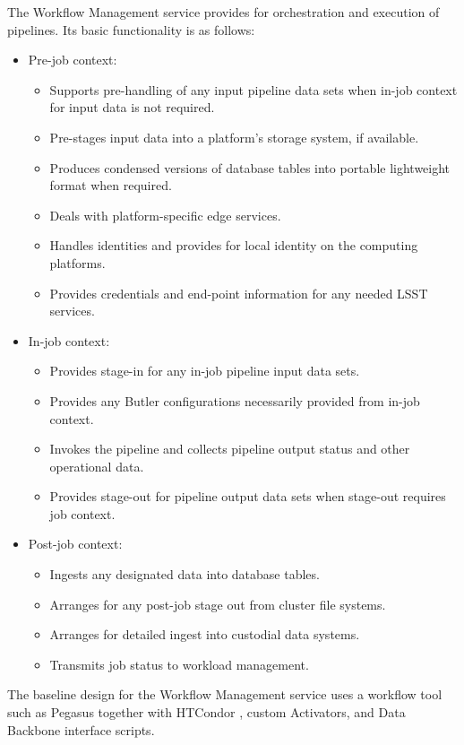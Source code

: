 \documentclass[DM,lsstdraft,toc]{lsstdoc}
\begin{document}
The Workflow Management service provides for orchestration and execution of
pipelines.  Its basic functionality is as follows:
\begin{itemize}
	\item Pre-job context:
		\begin{itemize}
			\item Supports pre-handling of any input pipeline data sets when in-job context for input data is not required.
			\item Pre-stages input data into a platform’s storage system, if available.
			\item Produces condensed versions of database tables into portable lightweight format when required.
			\item Deals with platform-specific edge services.
			\item Handles identities and provides for local identity on the computing platforms.
			\item Provides credentials and end-point information for any needed LSST services. 
		\end{itemize}
	\item In-job context:
		\begin{itemize}
			\item Provides stage-in for any in-job pipeline input data sets.
			\item Provides any Butler configurations necessarily provided from in-job context.
			\item Invokes the pipeline and collects pipeline output status and other operational data.
			\item Provides stage-out for pipeline output data sets when stage-out requires job context.
		\end{itemize}
	\item Post-job context:
		\begin{itemize}
			\item Ingests any designated data into database tables.
			\item Arranges for any post-job stage out from cluster file systems.
			\item Arranges for detailed ingest into custodial data systems.
			\item Transmits job status to workload management.
		\end{itemize}
\end{itemize}
 
The baseline design for the Workflow Management service uses a workflow tool
such as Pegasus \citep{Pegasus} together with HTCondor \citep{HTCondor}, custom
Activators, and Data Backbone interface scripts.
\end{document}

